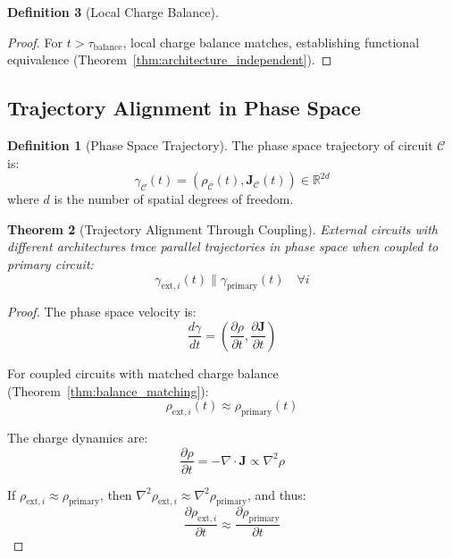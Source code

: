\documentclass[12pt,a4paper]{article}
\theoremstyle{plain}
\newtheorem{theorem}{Theorem}[section]
\theoremstyle{definition}
\newtheorem{definition}[theorem]{Definition}
\theoremstyle{remark}
\begin{document}
\begin{definition}[Local Charge Balance]
\begin{proof}
For $t > \tau_{\text{balance}}$, local charge balance matches, establishing functional equivalence (Theorem~\ref{thm:architecture_independent}).
\end{proof}

\subsection{Trajectory Alignment in Phase Space}

\begin{definition}[Phase Space Trajectory]
\label{def:phase_trajectory}
The phase space trajectory of circuit $\mathcal{C}$ is:
\begin{equation}
\gamma_{\mathcal{C}}(t) = (\rho_{\mathcal{C}}(t), \mathbf{J}_{\mathcal{C}}(t)) \in \mathbb{R}^{2d}
\end{equation}
where $d$ is the number of spatial degrees of freedom.
\end{definition}

\begin{theorem}[Trajectory Alignment Through Coupling]
\label{thm:trajectory_alignment}
External circuits with different architectures trace parallel trajectories in phase space when coupled to primary circuit:
\begin{equation}
\gamma_{\text{ext},i}(t) \parallel \gamma_{\text{primary}}(t) \quad \forall i
\end{equation}
\end{theorem}

\begin{proof}
The phase space velocity is:
\begin{equation}
\frac{d\gamma}{dt} = \left( \frac{\partial \rho}{\partial t}, \frac{\partial \mathbf{J}}{\partial t} \right)
\end{equation}

For coupled circuits with matched charge balance (Theorem~\ref{thm:balance_matching}):
\begin{equation}
\rho_{\text{ext},i}(t) \approx \rho_{\text{primary}}(t)
\end{equation}

The charge dynamics are:
\begin{equation}
\frac{\partial \rho}{\partial t} = -\nabla \cdot \mathbf{J} \propto \nabla^2 \rho
\end{equation}

If $\rho_{\text{ext},i} \approx \rho_{\text{primary}}$, then $\nabla^2 \rho_{\text{ext},i} \approx \nabla^2 \rho_{\text{primary}}$, and thus:
\begin{equation}
\frac{\partial \rho_{\text{ext},i}}{\partial t} \approx \frac{\partial \rho_{\text{primary}}}{\partial t}
\end{equation}


\end{proof}
\end{definition}
\end{document}

